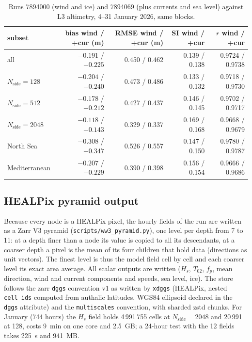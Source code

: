 \documentclass[11pt,a4paper]{article}
\newcommand{\nside}{N_{\mathrm{side}}}
\begin{document}
\begin{table}[H]
\centering\small
\begin{tabular}{lrrrr}
\toprule
subset & bias wind / +cur (m) & RMSE wind / +cur (m) & SI wind / +cur & $r$ wind / +cur \\
\midrule
all          & $-0.191$ / $-0.225$ & 0.450 / 0.462 & 0.139 / 0.138 & 0.9724 / 0.9738 \\
$\nside=128$ & $-0.204$ / $-0.240$ & 0.473 / 0.486 & 0.133 / 0.132 & 0.9718 / 0.9730 \\
$\nside=512$ & $-0.178$ / $-0.212$ & 0.427 / 0.437 & 0.146 / 0.145 & 0.9702 / 0.9717 \\
$\nside=2048$& $-0.118$ / $-0.143$ & 0.329 / 0.337 & 0.169 / 0.168 & 0.9668 / 0.9679 \\
North Sea    & $-0.308$ / $-0.347$ & 0.526 / 0.557 & 0.147 / 0.150 & 0.9780 / 0.9787 \\
Mediterranean& $-0.207$ / $-0.229$ & 0.390 / 0.398 & 0.156 / 0.154 & 0.9666 / 0.9686 \\
\bottomrule
\end{tabular}
\caption{Runs 7894000 (wind and ice) and 7894069 (plus currents and sea
level) against L3 altimetry, 4--31 January 2026, same blocks.}
\label{tab:cur}
\end{table}

\subsection{HEALPix pyramid output}
Because every node is a HEALPix pixel, the hourly fields of the run are
written as a Zarr V3 pyramid (\texttt{scripts/ww3\_pyramid.py}), one level
per depth from 7 to 11: at a depth finer than a node its value is copied to
all its descendants, at a coarser depth a pixel is the mean of its four
children that hold data (directions as unit vectors). The finest level is
thus the model field cell by cell and each coarser level its exact area
average. All scalar outputs are written ($H_s$, $T_{02}$, $f_p$, mean
direction, wind and current components and speeds, sea level, ice). The
store follows the zarr \texttt{dggs} convention v1 as written by
\texttt{xdggs} (HEALPix, nested \texttt{cell\_ids} computed from authalic
latitudes, WGS84 ellipsoid declared in the \texttt{dggs} attribute) and the
\texttt{multiscales} convention, with sharded zstd chunks. For January (744
hours) the $H_s$ field holds 4\,991\,755 cells at $\nside=2048$ and 20\,991
at 128, costs \SI{9}{min} on one core and \SI{2.5}{GB}; a 24-hour test with
the 12 fields takes \SI{225}{s} and \SI{941}{MB}.
\end{document}
